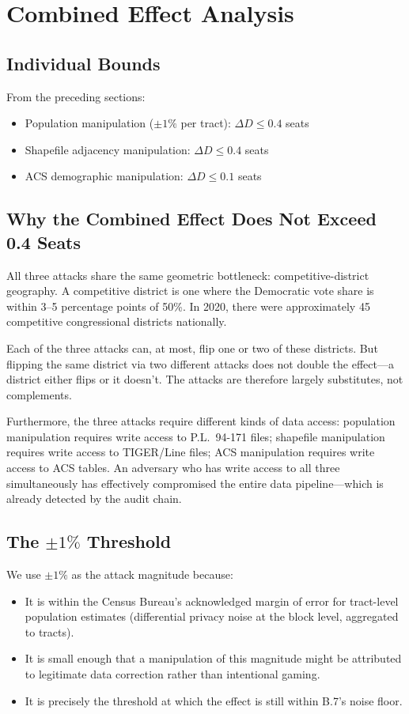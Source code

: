 \section{Combined Effect Analysis}
\label{sec:effect}

\subsection{Individual Bounds}

From the preceding sections:
\begin{itemize}
\item Population manipulation ($\pm 1\%$ per tract): $\Delta D \leq 0.4$ seats
\item Shapefile adjacency manipulation: $\Delta D \leq 0.4$ seats
\item ACS demographic manipulation: $\Delta D \leq 0.1$ seats
\end{itemize}

\subsection{Why the Combined Effect Does Not Exceed 0.4 Seats}

All three attacks share the same geometric bottleneck: competitive-district
geography.
A competitive district is one where the Democratic vote share is within
3--5 percentage points of 50\%.
In 2020, there were approximately 45 competitive congressional districts
nationally.

Each of the three attacks can, at most, flip one or two of these districts.
But flipping the same district via two different attacks does not double
the effect---a district either flips or it doesn't.
The attacks are therefore largely substitutes, not complements.

Furthermore, the three attacks require different kinds of data access:
population manipulation requires write access to P.L.\ 94-171 files;
shapefile manipulation requires write access to TIGER/Line files;
ACS manipulation requires write access to ACS tables.
An adversary who has write access to all three simultaneously has
effectively compromised the entire data pipeline---which is already
detected by the audit chain.

\subsection{The $\pm 1\%$ Threshold}

We use $\pm 1\%$ as the attack magnitude because:
\begin{itemize}
\item It is within the Census Bureau's acknowledged margin of error
  for tract-level population estimates (differential privacy noise
  at the block level, aggregated to tracts).
\item It is small enough that a manipulation of this magnitude might be
  attributed to legitimate data correction rather than intentional gaming.
\item It is precisely the threshold at which the effect is still within
  B.7's noise floor.
\end{itemize}

